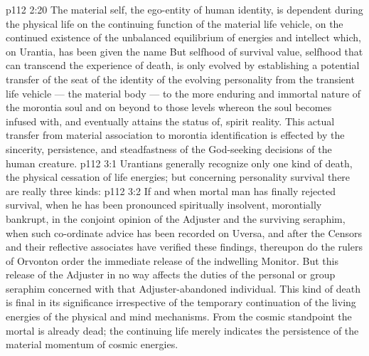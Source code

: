 \vs p112 2:20 \pc The material self, the ego\hyp{}entity of human identity, is dependent during the physical life on the continuing function of the material life vehicle, on the continued existence of the unbalanced equilibrium of energies and intellect which, on Urantia, has been given the name  But selfhood of survival value, selfhood that can transcend the experience of death, is only evolved by establishing a potential transfer of the seat of the identity of the evolving personality from the transient life vehicle --- the material body --- to the more enduring and immortal nature of the morontia soul and on beyond to those levels whereon the soul becomes infused with, and eventually attains the status of, spirit reality. This actual transfer from material association to morontia identification is effected by the sincerity, persistence, and steadfastness of the God\hyp{}seeking decisions of the human creature.
\vs p112 3:1 Urantians generally recognize only one kind of death, the physical cessation of life energies; but concerning personality survival there are really three kinds:
\vs p112 3:2 \bibnobreakspace {} If and when mortal man has finally rejected survival, when he has been pronounced spiritually insolvent, morontially bankrupt, in the conjoint opinion of the Adjuster and the surviving seraphim, when such co\hyp{}ordinate advice has been recorded on Uversa, and after the Censors and their reflective associates have verified these findings, thereupon do the rulers of Orvonton order the immediate release of the indwelling Monitor. But this release of the Adjuster in no way affects the duties of the personal or group seraphim concerned with that Adjuster\hyp{}abandoned individual. This kind of death is final in its significance irrespective of the temporary continuation of the living energies of the physical and mind mechanisms. From the cosmic standpoint the mortal is already dead; the continuing life merely indicates the persistence of the material momentum of cosmic energies.
